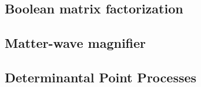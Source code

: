 \documentclass[twoside]{article}
\begin{document}
\subsection{Boolean matrix factorization}


\subsection{Matter-wave magnifier} \label{sec:mwm}

\subsection{Determinantal Point Processes}
 



\subsection{}



\newpage


\end{document}
